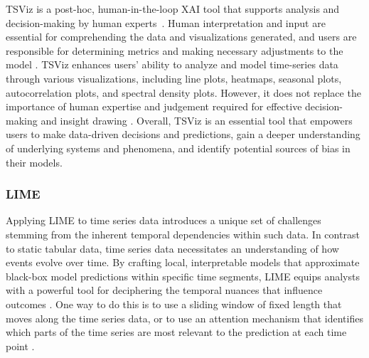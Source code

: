 \documentclass[final,5p,times,twocolumn]{elsarticle}
\begin{document}
TSViz is a post-hoc, human-in-the-loop XAI tool that supports analysis and decision-making by human experts~\cite{siddiqui2019tsviz}. Human interpretation and input are essential for comprehending the data and visualizations generated, and users are responsible for determining metrics and making necessary adjustments to the model \cite{mosqueira2022human}. TSViz enhances users' ability to analyze and model time-series data through various visualizations, including line plots, heatmaps, seasonal plots, autocorrelation plots, and spectral density plots. However, it does not replace the importance of human expertise and judgement required for effective decision-making and insight drawing \cite{schlegel2021time}. Overall, TSViz is an essential tool that empowers users to make data-driven decisions and predictions, gain a deeper understanding of underlying systems and phenomena, and identify potential sources of bias in their models.

\subsubsection{LIME}
Applying LIME to time series data introduces a unique set of challenges stemming from the inherent temporal dependencies within such data. In contrast to static tabular data, time series data necessitates an understanding of how events evolve over time. %
By crafting local, interpretable models that approximate black-box model predictions within specific time segments, LIME equips analysts with a powerful tool for deciphering the temporal nuances that influence outcomes \cite{plumb2018interpretable}. One way to do this is to use a sliding window of fixed length that moves along the time series data, or to use an attention mechanism that identifies which parts of the time series are most relevant to the prediction at each time point \cite{lipton2016modeling}.
\end{document}
